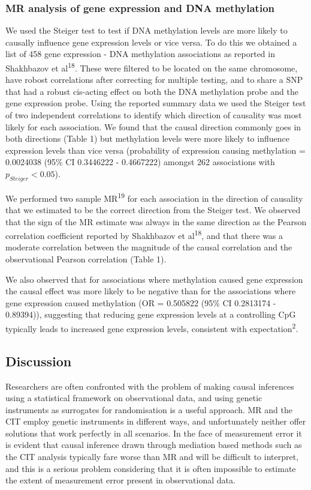 \documentclass[]{article}
\begin{document}
\subsubsection{MR analysis of gene expression and DNA
methylation}\label{mr-analysis-of-gene-expression-and-dna-methylation}

We used the Steiger test to test if DNA methylation levels are more
likely to causally influence gene expression levels or vice versa. To do
this we obtained a list of 458 gene expression - DNA methylation
associations as reported in Shakhbazov et al\textsuperscript{18}. These
were filtered to be located on the same chromosome, have robost
correlations after correcting for multiple testing, and to share a SNP
that had a robust cis-acting effect on both the DNA methylation probe
and the gene expression probe. Using the reported summary data we used
the Steiger test of two independent correlations to identify which
direction of causality was most likely for each association. We found
that the causal direction commonly goes in both directions (Table 1) but
methylation levels were more likely to influence expression levels than
vice versa (probability of expression causing methylation = 0.0024038
(95\% CI 0.3446222 - 0.4667222) amongst 262 associations with
\(p_{Steiger} < 0.05\)).

We performed two sample MR\textsuperscript{19} for each association in
the direction of causality that we estimated to be the correct direction
from the Steiger test. We observed that the sign of the MR estimate was
always in the same direction as the Pearson correlation coefficient
reported by Shakhbazov et al\textsuperscript{18}, and that there was a
moderate correlation between the magnitude of the causal correlation and
the observational Pearson correlation (Table 1).

We also observed that for associations where methylation caused gene
expression the causal effect was more likely to be negative than for the
associations where gene expression caused methylation (OR = 0.505822
(95\% CI 0.2813174 - 0.89394)), suggesting that reducing gene expression
levels at a controlling CpG typically leads to increased gene expression
levels, consistent with expectation\textsuperscript{2}.

\subsection{Discussion}\label{discussion}

Researchers are often confronted with the problem of making causal
inferences using a statistical framework on observational data, and
using genetic instruments as surrogates for randomisation is a useful
approach. MR and the CIT employ genetic instruments in different ways,
and unfortunately neither offer solutions that work perfectly in all
scenarios. In the face of measurement error it is evident that causal
inference drawn through mediation based methods such as the CIT analysis
typically fare worse than MR and will be difficult to interpret, and
this is a serious problem considering that it is often impossible to
estimate the extent of measurement error present in observational data.
\end{document}
